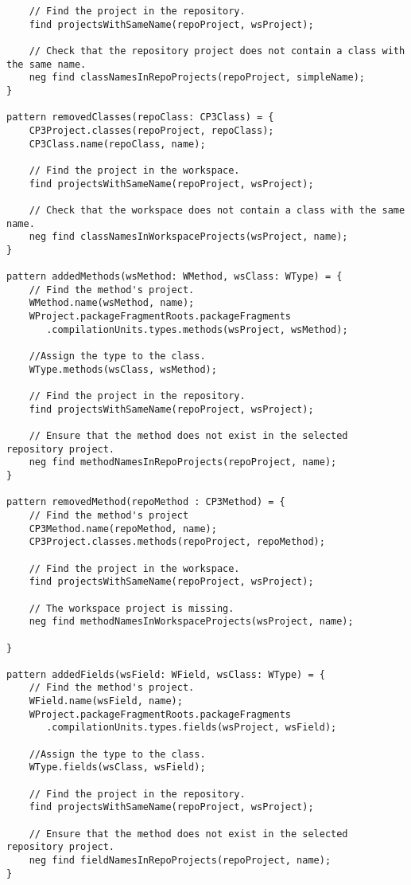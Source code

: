 \begin{lstlisting}
	// Find the project in the repository.
	find projectsWithSameName(repoProject, wsProject);

	// Check that the repository project does not contain a class with the same name.
	neg find classNamesInRepoProjects(repoProject, simpleName);
}

pattern removedClasses(repoClass: CP3Class) = {
	CP3Project.classes(repoProject, repoClass);
	CP3Class.name(repoClass, name);

	// Find the project in the workspace.
	find projectsWithSameName(repoProject, wsProject);

	// Check that the workspace does not contain a class with the same name.
	neg find classNamesInWorkspaceProjects(wsProject, name);
}

pattern addedMethods(wsMethod: WMethod, wsClass: WType) = {
	// Find the method's project.
	WMethod.name(wsMethod, name);
	WProject.packageFragmentRoots.packageFragments
	   .compilationUnits.types.methods(wsProject, wsMethod);

	//Assign the type to the class.
	WType.methods(wsClass, wsMethod);

	// Find the project in the repository.
	find projectsWithSameName(repoProject, wsProject);

	// Ensure that the method does not exist in the selected repository project.
	neg find methodNamesInRepoProjects(repoProject, name);
}

pattern removedMethod(repoMethod : CP3Method) = {
	// Find the method's project
	CP3Method.name(repoMethod, name);
	CP3Project.classes.methods(repoProject, repoMethod);

	// Find the project in the workspace.
	find projectsWithSameName(repoProject, wsProject);

	// The workspace project is missing.
	neg find methodNamesInWorkspaceProjects(wsProject, name);

}

pattern addedFields(wsField: WField, wsClass: WType) = {
	// Find the method's project.
	WField.name(wsField, name);
	WProject.packageFragmentRoots.packageFragments
	   .compilationUnits.types.fields(wsProject, wsField);

	//Assign the type to the class.
	WType.fields(wsClass, wsField);

	// Find the project in the repository.
	find projectsWithSameName(repoProject, wsProject);

	// Ensure that the method does not exist in the selected repository project.
	neg find fieldNamesInRepoProjects(repoProject, name);
}


\end{lstlisting}
